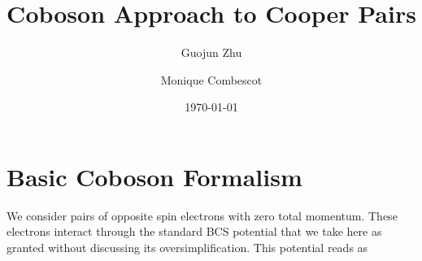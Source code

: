 \documentclass[aps,pra,amsmath,amssymb,preprint,groupedaddress]{revtex4}
\begin{document}

\title{Coboson Approach to
 Cooper Pairs}


\author{Guojun Zhu}

\affiliation{}
\author{Monique Combescot}

\date{\today}

\begin{abstract}
\end{abstract}

\pacs{}

\maketitle

\section{Basic Coboson Formalism}
We consider pairs of opposite spin electrons with zero total momentum.  These electrons interact through the standard BCS potential that we take here as granted without discussing its oversimplification. This potential reads as 
\end{document}
